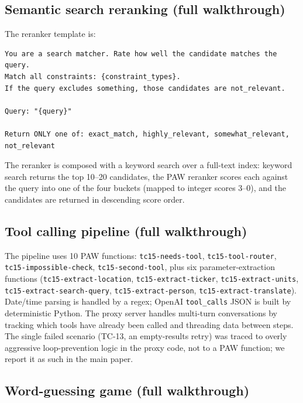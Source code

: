 \subsection{Semantic search reranking (full walkthrough)}

The reranker template is:
\begin{tcolorbox}[colframe=borderblue, colback=bggray]
\scriptsize
\begin{verbatim}
You are a search matcher. Rate how well the candidate matches the query.
Match all constraints: {constraint_types}.
If the query excludes something, those candidates are not_relevant.

Query: "{query}"

Return ONLY one of: exact_match, highly_relevant, somewhat_relevant, not_relevant
\end{verbatim}
\end{tcolorbox}
The reranker is composed with a keyword search over a full-text index: keyword search returns the top 10--20 candidates, the PAW reranker scores each against the query into one of the four buckets (mapped to integer scores 3--0), and the candidates are returned in descending score order.

\subsection{Tool calling pipeline (full walkthrough)}

The pipeline uses 10 PAW functions: \texttt{tc15-needs-tool}, \texttt{tc15-tool-router}, \texttt{tc15-impossible-check}, \texttt{tc15-second-tool}, plus six parameter-extraction functions (\texttt{tc15-extract-location}, \texttt{tc15-extract-ticker}, \texttt{tc15-extract-units}, \texttt{tc15-extract-search-query}, \texttt{tc15-extract-person}, \texttt{tc15-extract-translate}). Date/time parsing is handled by a regex; OpenAI \texttt{tool\_calls} JSON is built by deterministic Python. The proxy server handles multi-turn conversations by tracking which tools have already been called and threading data between steps. The single failed scenario (TC-13, an empty-results retry) was traced to overly aggressive loop-prevention logic in the proxy code, not to a PAW function; we report it as such in the main paper.

\subsection{Word-guessing game (full walkthrough)}


